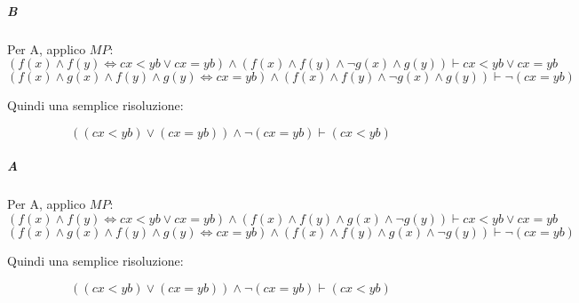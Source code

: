 \subparagraph{B}

Per A, applico $MP$:
\[
    (f(x) \land f(y) \Leftrightarrow cx < yb \lor cx = yb) \land (f(x) \land f(y) \land \neg g(x) \land g(y)) \vdash cx < yb \lor cx = yb
\]
\[
    (f(x) \land g(x) \land f(y) \land g(y) \Leftrightarrow cx = yb) \land (f(x) \land f(y) \land \neg g(x) \land g(y)) \vdash \neg (cx = yb)
\]

Quindi una semplice risoluzione:

\[
    ((cx < yb) \lor (cx = yb)) \land \neg (cx = yb) \vdash (cx < yb)
\]

\subparagraph{A}

Per A, applico $MP$:
\[
    (f(x) \land f(y) \Leftrightarrow cx < yb \lor cx = yb) \land (f(x) \land f(y) \land g(x) \land \neg g(y)) \vdash cx < yb \lor cx = yb
\]
\[
    (f(x) \land g(x) \land f(y) \land g(y) \Leftrightarrow cx = yb) \land (f(x) \land f(y) \land g(x) \land \neg g(y)) \vdash \neg (cx = yb)
\]

Quindi una semplice risoluzione:

\[
    ((cx < yb) \lor (cx = yb)) \land \neg (cx = yb) \vdash (cx < yb)
\]
